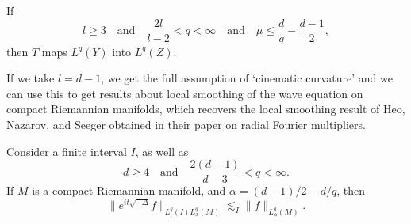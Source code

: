 \begin{theorem}
    If
    \[ l \geq 3 \quad\text{and}\quad \frac{2l}{l-2} < q < \infty \quad\text{and}\quad \mu \leq \frac{d}{q} - \frac{d-1}{2}, \]
    then $T$ maps $L^q(Y)$ into $L^q(Z)$.
\end{theorem}

If we take $l = d-1$, we get the full assumption of `cinematic curvature' and we can use this to get results about local smoothing of the wave equation on compact Riemannian manifolds, which recovers the local smoothing result of Heo, Nazarov, and Seeger obtained in their paper on radial Fourier multipliers.

\begin{theorem}
    Consider a finite interval $I$, as well as
    \[ d \geq 4 \quad\text{and}\quad \frac{2(d-1)}{d - 3} < q < \infty. \]
    If $M$ is a compact Riemannian manifold, and $\alpha = (d-1)/2 - d/q$, then
    \[ \| e^{it \sqrt{-\Delta}} f \|_{L^q_t(I) L^q_x(M)} \lesssim_I \| f \|_{L^q_\alpha(M)}. \]
\end{theorem}
